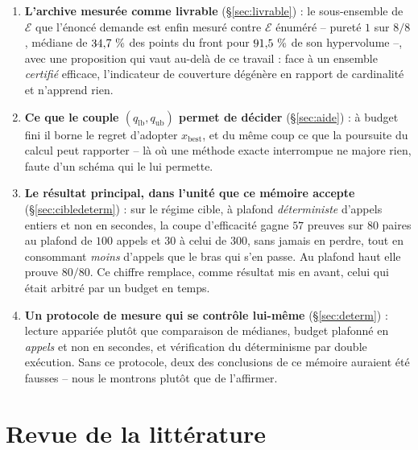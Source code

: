 \documentclass[11pt,a4paper]{article}
\theoremstyle{plain}
\theoremstyle{remark}
\newcommand{\Ecal}{\mathcal{E}}
\begin{document}
\begin{enumerate}[leftmargin=*,itemsep=3pt]
      incomparable à la première, dont on prend le minimum. C'est le levier
      le plus fort mesuré ici, et sa forme est rare et énorme plutôt que
      fréquente et petite : jusqu'à $+\gainGeomMax{}$ points sur une ligne,
      $+131{,}31$ de gains cumulés contre $-0{,}19$ de pertes.
\item \textbf{L'archive mesurée comme livrable} (\S\ref{sec:livrable}) :
      le sous-ensemble de $\Ecal$ que l'énoncé demande est enfin mesuré
      contre $\Ecal$ énuméré -- pureté $1$ sur $8/8$, médiane de
      $34{,}7{}\ \%$ des points du front pour $91{,}5{}\ \%$ de son
      hypervolume --, avec une proposition qui vaut au-delà de ce travail :
      face à un ensemble \emph{certifié} efficace, l'indicateur de
      couverture dégénère en rapport de cardinalité et n'apprend rien.
\item \textbf{Ce que le couple $(q_{\text{lb}},q_{\text{ub}})$ permet de
      décider} (\S\ref{sec:aide}) : à budget fini il borne le regret
      d'adopter $x_{\text{best}}$, et du même coup ce que la poursuite du
      calcul peut rapporter -- là où une méthode exacte interrompue ne
      majore rien, faute d'un schéma qui le lui permette.
\item \textbf{Le résultat principal, dans l'unité que ce mémoire accepte}
      (\S\ref{sec:cibledeterm}) : sur le régime cible, à plafond
      \emph{déterministe} d'appels entiers et non en secondes, la coupe
      d'efficacité gagne $57$ preuves sur $80$ paires au plafond de $100$
      appels et $30$ à celui de $300$, sans jamais en perdre, tout en
      consommant \emph{moins} d'appels que le bras qui s'en passe. Au
      plafond haut elle prouve $80/80$. Ce chiffre remplace, comme résultat
      mis en avant, celui qui était arbitré par un budget en temps.
\item \textbf{Un protocole de mesure qui se contrôle lui-même}
      (\S\ref{sec:determ}) : lecture appariée plutôt que comparaison de
      médianes, budget plafonné en \emph{appels} et non en secondes, et
      vérification du déterminisme par double exécution. Sans ce protocole,
      deux des conclusions de ce mémoire auraient été fausses -- nous le
      montrons plutôt que de l'affirmer.
\end{enumerate}

\section{Revue de la littérature}
\label{sec:litt}
\label{sec:revue}
\end{document}
